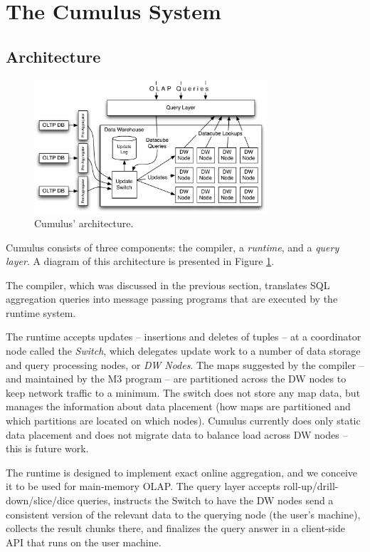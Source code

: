 

\section{The Cumulus System}
\label{sec:architecture}


\subsection{Architecture}


\begin{figure}
\hspace{-3mm}
\includegraphics[width=3.4in]{images/Architecture.pdf}

\vspace{-4mm}

\caption{Cumulus' architecture.}
\label{fig:arch}
\end{figure}


Cumulus consists of three components: the compiler,
a {\em runtime}, and a {\em query layer}.
A diagram of this architecture is presented in Figure \ref{fig:arch}.

The compiler, which was discussed in the
previous section, translates SQL aggregation queries
into message passing programs that are executed by the runtime system.

The runtime accepts updates -- insertions and deletes of tuples --
at a coordinator node called the \textit{Switch}, which delegates
update work to a number of data storage and query processing nodes, or
\textit{DW Nodes}.
The maps suggested by the compiler -- and maintained by the M3 program --
are partitioned across the DW nodes to keep network traffic to a minimum.  
The switch does not store any map data, but manages
the information about data placement (how maps are partitioned and which
partitions are located on which nodes).
Cumulus currently does only static data placement and does not migrate
data to balance load across DW nodes -- this is future work.

The runtime is designed to implement exact online aggregation, and
we conceive it to be used for main-memory OLAP.
The query layer accepts roll-up/drill-down/slice/dice queries,
instructs the Switch to have the DW nodes send a consistent version of
the relevant data to the querying node (the user's machine),
collects the result chunks there, and
finalizes the query answer
in a client-side API that runs on the user machine.

